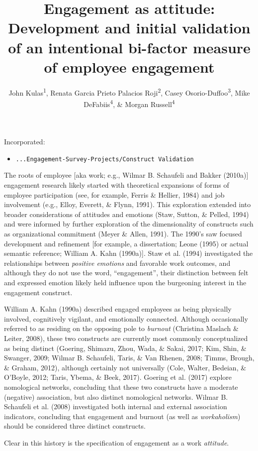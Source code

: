 \documentclass[
  man]{apa6}
\title{Engagement as attitude: Development and initial validation of an intentional bi-factor measure of employee engagement}
\author{John Kulas\textsuperscript{1}, Renata Garcia Prieto Palacios Roji\textsuperscript{2}, Casey Osorio-Duffoo\textsuperscript{3}, Mike DeFabiis\textsuperscript{4}, \& Morgan Russell\textsuperscript{4}}
\date{}
\affiliation{\vspace{0.5cm}\textsuperscript{1} eRg\\\textsuperscript{2} PepsiCo\\\textsuperscript{3} Harver\\\textsuperscript{4} Montclair State University}
\providecommand{\tightlist}{%
  \setlength{\itemsep}{0pt}\setlength{\parskip}{0pt}}
\begin{document}
\maketitle

Incorporated:

\begin{itemize}
\tightlist
\item
  \texttt{...Engagement-Survey-Projects/Construct\ Validation}
\end{itemize}

The roots of employee {[}aka work; e.g., Wilmar B. Schaufeli and Bakker (2010a){]} engagement research likely started with theoretical expansions of forms of employee participation (see, for example, Ferris \& Hellier, 1984) and job involvement (e.g., Elloy, Everett, \& Flynn, 1991). This exploration extended into broader considerations of attitudes and emotions (Staw, Sutton, \& Pelled, 1994) and were informed by further exploration of the dimensionality of constructs such as organizational commitment (Meyer \& Allen, 1991). The 1990's saw focused development and refinement {[}for example, a dissertation; Leone (1995) or actual semantic reference; William A. Kahn (1990a){]}. Staw et al. (1994) investigated the relationships between \emph{positive emotions} and favorable work outcomes, and although they do not use the word, ``engagement'', their distinction between felt and expressed emotion likely held influence upon the burgeoning interest in the engagement construct.

William A. Kahn (1990a) described engaged employees as being physically involved, cognitively vigilant, and emotionally connected. Although occasionally referred to as residing on the opposing pole to \emph{burnout} (Christina Maslach \& Leiter, 2008), these two constructs are currently most commonly conceptualized as being distinct (Goering, Shimazu, Zhou, Wada, \& Sakai, 2017; Kim, Shin, \& Swanger, 2009; Wilmar B. Schaufeli, Taris, \& Van Rhenen, 2008; Timms, Brough, \& Graham, 2012), although certainly not universally (Cole, Walter, Bedeian, \& O'Boyle, 2012; Taris, Ybema, \& Beek, 2017). Goering et al. (2017) explore nomological networks, concluding that these two constructs have a moderate (negative) association, but also distinct nomological networks. Wilmar B. Schaufeli et al. (2008) investigated both internal and external association indicators, concluding that engagement and burnout (as well as \emph{workaholism}) should be considered three distinct constructs.

Clear in this history is the specification of engagement as a work \emph{attitude}.
\end{document}
